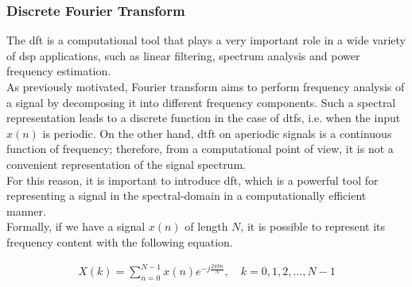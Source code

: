 \subsubsection{Discrete Fourier Transform}
The \gls{dft} is a computational tool that plays a very important role in a wide variety of \gls{dsp} applications, such as linear filtering, spectrum analysis and power frequency estimation. \\
As previously motivated, Fourier transform aims to perform frequency analysis of a signal by decomposing it into different frequency components. Such a spectral representation leads to a discrete function in the case of \gls{dtfs}, i.e. when the input $x(n)$ is periodic. On the other hand, \gls{dtft} on aperiodic signals is a continuous function of frequency; therefore, from a computational point of view, it is not a convenient representation of the signal spectrum. \\
For this reason, it is important to introduce \gls{dft}, which is a powerful tool for representing a signal in the spectral-domain in a computationally efficient manner. \\
Formally, if we have a signal $x(n)$ of length $N$, it is possible to represent its frequency content with the following equation.

\begin{align}\label{eq:dft}
	X(k) =\sum_{n=0}^{N-1} x(n) e^{-j \frac{2 \pi k n}{N}}, \quad k=0,1,2, \ldots, N-1 
\end{align}

